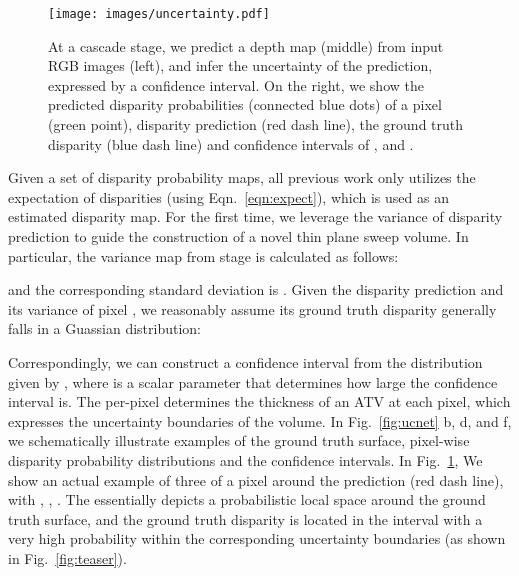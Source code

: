 {\begin{figure}[t]
    \centering
    \texttt{[image: images/uncertainty.pdf]}
    \caption{At a cascade stage, we predict a depth map (middle) from input RGB images (left), and infer the uncertainty of the prediction, expressed by a confidence interval. 
    On the right, we show the predicted disparity probabilities (connected blue dots) of a pixel (green point), disparity prediction (red dash line), the ground truth disparity (blue dash line) and confidence intervals of ,  and .}
    \label{fig:method}
\end{figure}

Given a set of disparity probability maps, all previous work only utilizes the expectation of disparities (using Eqn.~\eqref{eqn:expect}), which is used as an estimated disparity map.
For the first time, we leverage the variance of disparity prediction to guide the construction of a novel thin plane sweep volume.
In particular, the variance map  from stage  is calculated as follows:


and the corresponding standard deviation is .
Given the disparity prediction  and its variance  of pixel , we reasonably assume its ground truth disparity  generally falls in a Guassian distribution:

Correspondingly, we can construct a confidence interval  from the distribution given by 
,
where  is a scalar parameter that determines how large the confidence interval is.
The per-pixel  determines the thickness of an ATV at each pixel, which expresses the uncertainty boundaries of the volume.
In Fig.~\ref{fig:ucnet} b, d, and f, we schematically illustrate examples of the ground truth surface, pixel-wise disparity probability distributions and the confidence intervals. 
In Fig.~\ref{fig:method}, We show an actual example of three  of a pixel around the prediction (red dash line), with , , .
The  essentially depicts a probabilistic local space around the ground truth surface, and the ground truth disparity is located in the interval with a very high probability within the corresponding uncertainty boundaries (as shown in Fig.~\ref{fig:teaser}).

}
